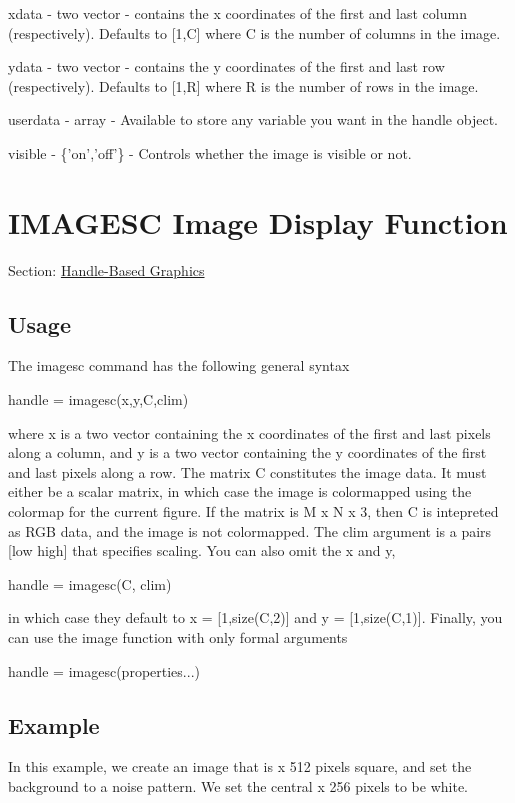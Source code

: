 \begin{DoxyItemize}
\item {\ttfamily xdata} -\/ {\ttfamily two vector} -\/ contains the x coordinates of the first and last column (respectively). Defaults to {\ttfamily \mbox{[}1,C\mbox{]}} where {\ttfamily C} is the number of columns in the image.  
\item {\ttfamily ydata} -\/ {\ttfamily two vector} -\/ contains the y coordinates of the first and last row (respectively). Defaults to {\ttfamily \mbox{[}1,R\mbox{]}} where {\ttfamily R} is the number of rows in the image.  
\item {\ttfamily userdata} -\/ {\ttfamily array} -\/ Available to store any variable you want in the handle object.  
\item {\ttfamily visible} -\/ {\ttfamily \{'on','off'\}} -\/ Controls whether the image is visible or not.  
\end{DoxyItemize}\hypertarget{handle_imagesc}{}\section{I\-M\-A\-G\-E\-S\-C Image Display Function}\label{handle_imagesc}
Section\-: \hyperlink{sec_handle}{Handle-\/\-Based Graphics} \hypertarget{vtkwidgets_vtkxyplotwidget_Usage}{}\subsection{Usage}\label{vtkwidgets_vtkxyplotwidget_Usage}
The {\ttfamily imagesc} command has the following general syntax \begin{DoxyVerb}  handle = imagesc(x,y,C,clim)
\end{DoxyVerb}
 where {\ttfamily x} is a two vector containing the {\ttfamily x} coordinates of the first and last pixels along a column, and {\ttfamily y} is a two vector containing the {\ttfamily y} coordinates of the first and last pixels along a row. The matrix {\ttfamily C} constitutes the image data. It must either be a scalar matrix, in which case the image is colormapped using the {\ttfamily colormap} for the current figure. If the matrix is {\ttfamily M x N x 3}, then {\ttfamily C} is intepreted as R\-G\-B data, and the image is not colormapped. The {\ttfamily clim} argument is a pairs \mbox{[}low high\mbox{]} that specifies scaling. You can also omit the {\ttfamily x} and {\ttfamily y}, \begin{DoxyVerb}  handle = imagesc(C, clim)
\end{DoxyVerb}
 in which case they default to {\ttfamily x = \mbox{[}1,size(\-C,2)\mbox{]}} and {\ttfamily y = \mbox{[}1,size(\-C,1)\mbox{]}}. Finally, you can use the {\ttfamily image} function with only formal arguments \begin{DoxyVerb}  handle = imagesc(properties...)
\end{DoxyVerb}
\hypertarget{variables_struct_Example}{}\subsection{Example}\label{variables_struct_Example}
In this example, we create an image that is { x 512} pixels square, and set the background to a noise pattern. We set the central { x 256} pixels to be white.


